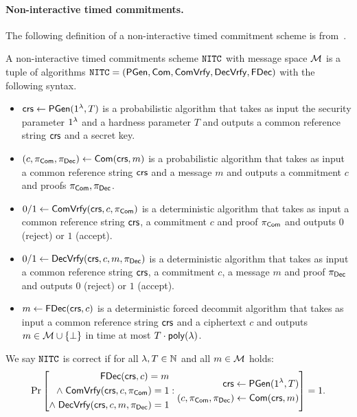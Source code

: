 \paragraph{Non-interactive timed commitments.}
The following definition of a non-interactive timed commitment scheme is from~\cite{TCC:KatLosXu20}.
\begin{definition}
\label{def:nitc_syntax}
A non-interactive timed commitments scheme $\mathtt{NITC}$ with message space $\mathcal{M}$ is a tuple of algorithms $\mathtt{NITC} = (\mathsf{PGen}, \mathsf{Com}, \mathsf{ComVrfy}, \mathsf{DecVrfy}, \allowbreak \mathsf{FDec})$ with the following syntax.
\begin{itemize}
\item $\mathsf{crs} \leftarrow \mathsf{PGen}(1{^{\lambda}}, T)$ is a probabilistic algorithm that takes as input the security parameter $1{^{\lambda}}$ and a hardness parameter $T$ and outputs a common reference string $\mathsf{crs}$ and a secret key.
\item $(c, \pi_{\mathsf{Com}}, \pi_{\mathsf{Dec}}) \leftarrow \mathsf{Com}(\mathsf{crs}, m)$ is a probabilistic algorithm that takes as input a common reference string $\mathsf{crs}$ and a message $m$ and outputs a commitment $c$ and proofs $\pi_{\mathsf{Com}}, \pi_{\mathsf{Dec}}$.
\item $0/1 \leftarrow \mathsf{ComVrfy}(\mathsf{crs}, c, \pi_{\mathsf{Com}})$ is a deterministic algorithm that takes as input a common reference string $\mathsf{crs}$, a commitment $c$ and proof $\pi_{\mathsf{Com}}$ and outputs $0$ (reject) or $1$ (accept).
\item $0/1 \leftarrow \mathsf{DecVrfy}(\mathsf{crs}, c, m, \pi_{\mathsf{Dec}})$ is a deterministic algorithm that takes as input a common reference string $\mathsf{crs}$, a commitment $c$, a message $m$ and proof $\pi_{\mathsf{Dec}}$ and outputs $0$ (reject) or $1$ (accept).
\item $m \leftarrow \mathsf{FDec}(\mathsf{crs}, c)$ is a deterministic forced decommit algorithm that takes as input a common reference string $\mathsf{crs}$ and a ciphertext $c$ and outputs $m \in \mathcal{M} \cup \{\bot\}$ in time at most $T \cdot \mathsf{poly}(\lambda)$.
\end{itemize}
We say $\mathtt{NITC}$ is correct if for all $\lambda, T \in \mathbb{N}$ and all $m \in \mathcal{M}$ holds:
\[\Pr\left[
\begin{aligned}
\mathsf{FDec}(\mathsf{crs}, c) = m \\
\land \; \mathsf{ComVrfy}(\mathsf{crs}, c, \pi_{\mathsf{Com}}) = 1 \\
\land \; \mathsf{DecVrfy}(\mathsf{crs}, c, m, \pi_{\mathsf{Dec}})=1
\end{aligned}
: 
\begin{aligned}
      \mathsf{crs} \leftarrow \mathsf{PGen}(1{^{\lambda}}, T) \\
      (c, \pi_{\mathsf{Com}}, \pi_{\mathsf{Dec}}) \leftarrow \mathsf{Com}(\mathsf{crs}, m) \\
    \end{aligned}
\right] = 1.
\]
\end{definition}

